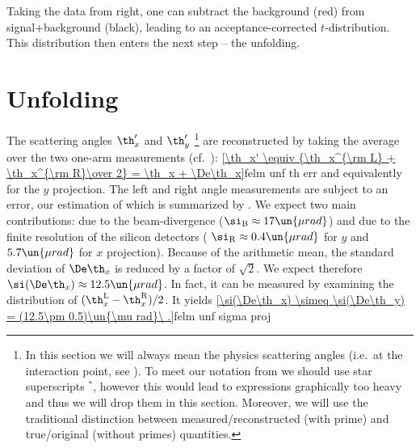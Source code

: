 
Taking the data from  right, one can subtract the background (red) from signal+background (black), leading to an acceptance-corrected $t$-distribution. This distribution then enters the next step -- the unfolding.


\section[felm unfold]{Unfolding}

The scattering angles $\th_x'$ and $\th_y'$ \footnote{
In this section we will always mean the physics scattering angles (i.e.~at the interaction point, see ). To meet our notation from  we should use star superscripts $^*$, however this would lead to expressions graphically too heavy and thus we will drop them in this section. Moreover, we will use the traditional distinction between measured/reconstructed (with prime) and true/original (without primes) quantities.
} are reconstructed by taking the average over the two one-arm measurements (cf.~):
\eqref{\th_x' \equiv {\th_x^{\rm L} + \th_x^{\rm R}\over 2} = \th_x + \De\th_x}{felm unf th err}
and equivalently for the $y$ projection. The left and right angle measurements are subject to an error, our estimation of which is summarized by . We expect two main contributions: due to the beam-divergence ($\si_{\rm B} \approx 17\un{\mu rad}$) and due to the finite resolution of the silicon detectors (
$\si_{\rm R} \approx 0.4\un{\mu rad}$ for $y$ and $5.7\un{\mu rad}$ for $x$ projection). Because of the arithmetic mean, the standard deviation of $\De\th_x$ is reduced by a factor of $\sqrt 2$. We expect therefore $\si(\De\th_x) \approx 12.5\un{\mu rad}$. In fact, it can be measured by examining the distribution of $(\th_x^{\rm L} - \th_x^{\rm R})/2$. It yields
\eqref{\si(\De\th_x) \simeq \si(\De\th_y) = (12.5\pm 0.5)\un{\mu rad}\ .}{felm unf sigma proj}

